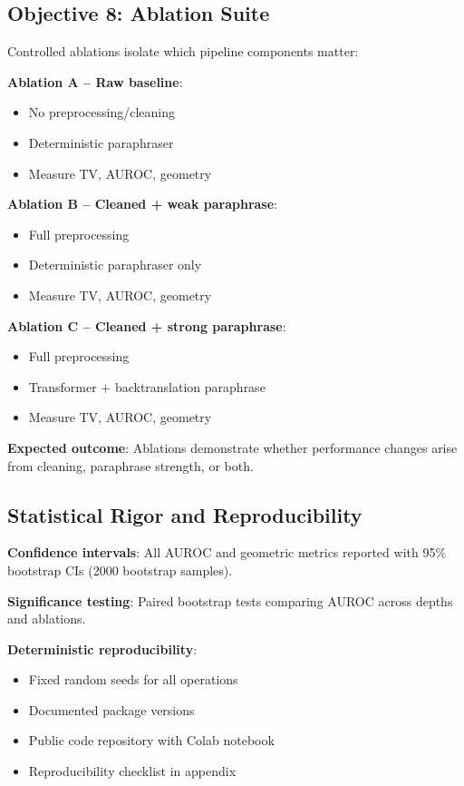 \documentclass[conference]{IEEEtran}
\begin{document}
\subsection{Objective 8: Ablation Suite}

Controlled ablations isolate which pipeline components matter:

\textbf{Ablation A – Raw baseline}:
\begin{itemize}
    \item No preprocessing/cleaning
    \item Deterministic paraphraser
    \item Measure TV, AUROC, geometry
\end{itemize}

\textbf{Ablation B – Cleaned + weak paraphrase}:
\begin{itemize}
    \item Full preprocessing
    \item Deterministic paraphraser only
    \item Measure TV, AUROC, geometry
\end{itemize}

\textbf{Ablation C – Cleaned + strong paraphrase}:
\begin{itemize}
    \item Full preprocessing
    \item Transformer + backtranslation paraphrase
    \item Measure TV, AUROC, geometry
\end{itemize}

\textbf{Expected outcome}: Ablations demonstrate whether performance changes arise from cleaning, paraphrase strength, or both.

\subsection{Statistical Rigor and Reproducibility}

\textbf{Confidence intervals}: All AUROC and geometric metrics reported with 95\% bootstrap CIs (2000 bootstrap samples).

\textbf{Significance testing}: Paired bootstrap tests comparing AUROC across depths and ablations.

\textbf{Deterministic reproducibility}:
\begin{itemize}
    \item Fixed random seeds for all operations
    \item Documented package versions
    \item Public code repository with Colab notebook
    \item Reproducibility checklist in appendix
\end{itemize}
\end{document}

